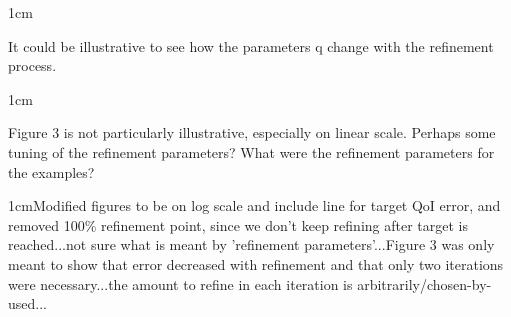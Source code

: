 \documentclass[12pt, letterpaper]{article}
\newcommand{\answer}[1]{\begin{adjustwidth}{1cm}{}{\color{blue}#1}\end{adjustwidth}}
\newcommand{\notdone}{{\color{red}{Changes not yet made.}}}
\begin{document}
\answer{}
\notdone

It could be illustrative to see how the parameters q change with the refinement process.

\answer{}
\notdone

Figure 3 is not particularly illustrative, especially on linear scale. Perhaps some tuning of the
refinement parameters? What were the refinement parameters for the examples?

\answer{Modified figures to be on log scale and include line for target QoI error, and removed 100\% refinement point, since we don't keep refining after target is reached...not sure what is meant by 'refinement parameters'...Figure 3 was only meant to show that error decreased with refinement and that only two iterations were necessary...the amount to refine in each iteration is arbitrarily/chosen-by-used...}
\notdone
\end{document}

